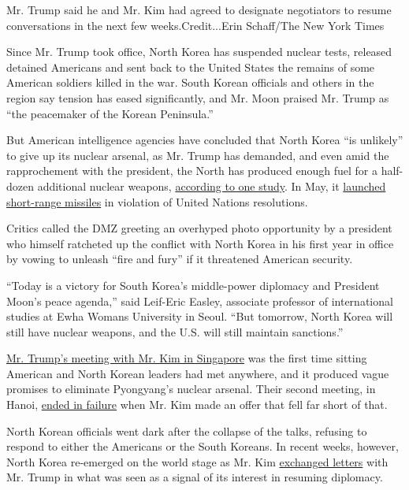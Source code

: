 Mr. Trump said he and Mr. Kim had agreed to designate negotiators to
resume conversations in the next few weeks.Credit...Erin Schaff/The New
York Times

Since Mr. Trump took office, North Korea has suspended nuclear tests,
released detained Americans and sent back to the United States the
remains of some American soldiers killed in the war. South Korean
officials and others in the region say tension has eased significantly,
and Mr. Moon praised Mr. Trump as ``the peacemaker of the Korean
Peninsula.''

But American intelligence agencies have concluded that North Korea ``is
unlikely'' to give up its nuclear arsenal, as Mr. Trump has demanded,
and even amid the rapprochement with the president, the North has
produced enough fuel for a half-dozen additional nuclear weapons,
\href{https://www.reuters.com/article/us-northkorea-usa-nuclear-study/north-korea-may-have-made-more-nuclear-bombs-but-threat-reduced-study-idUSKCN1Q10EL}{according
to one study}. In May, it
\href{https://www.nytimes3xbfgragh.onion/2019/05/04/world/asia/north-korea-missiles-trump.html?module=inline}{launched
short-range missiles} in violation of United Nations resolutions.

Critics called the DMZ greeting an overhyped photo opportunity by a
president who himself ratcheted up the conflict with North Korea in his
first year in office by vowing to unleash ``fire and fury'' if it
threatened American security.

``Today is a victory for South Korea's middle-power diplomacy and
President Moon's peace agenda,'' said Leif-Eric Easley, associate
professor of international studies at Ewha Womans University in Seoul.
``But tomorrow, North Korea will still have nuclear weapons, and the
U.S. will still maintain sanctions.''

\href{https://www.nytimes3xbfgragh.onion/2018/06/12/world/asia/north-korea-summit.html}{Mr.
Trump's meeting with Mr. Kim in Singapore} was the first time sitting
American and North Korean leaders had met anywhere, and it produced
vague promises to eliminate Pyongyang's nuclear arsenal. Their second
meeting, in Hanoi,
\href{https://www.nytimes3xbfgragh.onion/2019/02/28/world/asia/trump-kim-vietnam-summit.html?module=inline}{ended
in failure} when Mr. Kim made an offer that fell far short of that.

North Korean officials went dark after the collapse of the talks,
refusing to respond to either the Americans or the South Koreans. In
recent weeks, however, North Korea re-emerged on the world stage as Mr.
Kim
\href{https://www.nytimes3xbfgragh.onion/2019/06/22/world/asia/north-korea-letter.html}{exchanged
letters} with Mr. Trump in what was seen as a signal of its interest in
resuming diplomacy.

